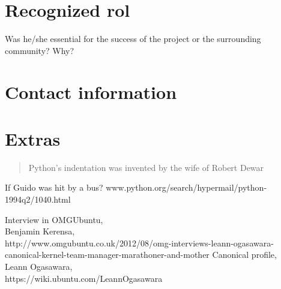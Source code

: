 \documentclass[11pt]{scrartcl}
\begin{document}
\section{Recognized rol}

Was he/she essential for the success of the project or the surrounding community? Why?

\section{Contact information}

\section{Extras}

\begin{quote}Python's indentation was invented by the wife of Robert Dewar\end{quote}

If Guido was hit by a bus? www.python.org/search/hypermail/python-1994q2/1040.html

\begin{thebibliography}{9}

      Interview in OMGUbuntu,\\
      Benjamin Kerensa,\\
      http://www.omgubuntu.co.uk/2012/08/omg-interviews-leann-ogasawara-canonical-kernel-team-manager-marathoner-and-mother
    Canonical profile,\\
    Leann Ogasawara,\\
    https://wiki.ubuntu.com/LeannOgasawara

\end{thebibliography}
\end{document}
